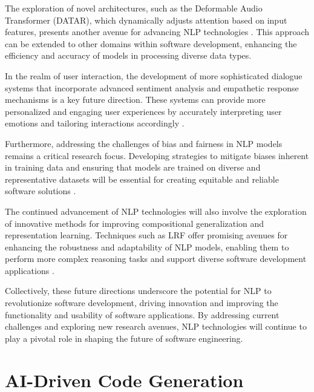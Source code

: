 The exploration of novel architectures, such as the Deformable Audio Transformer (DATAR), which dynamically adjusts attention based on input features, presents another avenue for advancing NLP technologies \cite{zhu2024deformableaudiotransformeraudio}. This approach can be extended to other domains within software development, enhancing the efficiency and accuracy of models in processing diverse data types.



In the realm of user interaction, the development of more sophisticated dialogue systems that incorporate advanced sentiment analysis and empathetic response mechanisms is a key future direction. These systems can provide more personalized and engaging user experiences by accurately interpreting user emotions and tailoring interactions accordingly \cite{jannidis2016analyzingfeaturesdetectionhappy}.



Furthermore, addressing the challenges of bias and fairness in NLP models remains a critical research focus. Developing strategies to mitigate biases inherent in training data and ensuring that models are trained on diverse and representative datasets will be essential for creating equitable and reliable software solutions \cite{touvron2023llama}.



The continued advancement of NLP technologies will also involve the exploration of innovative methods for improving compositional generalization and representation learning. Techniques such as LRF offer promising avenues for enhancing the robustness and adaptability of NLP models, enabling them to perform more complex reasoning tasks and support diverse software development applications \cite{zheng2023layerwiserepresentationfusioncompositional}.



Collectively, these future directions underscore the potential for NLP to revolutionize software development, driving innovation and improving the functionality and usability of software applications. By addressing current challenges and exploring new research avenues, NLP technologies will continue to play a pivotal role in shaping the future of software engineering.











\section{AI-Driven Code Generation} \label{sec:AI-Driven Code Generation}

